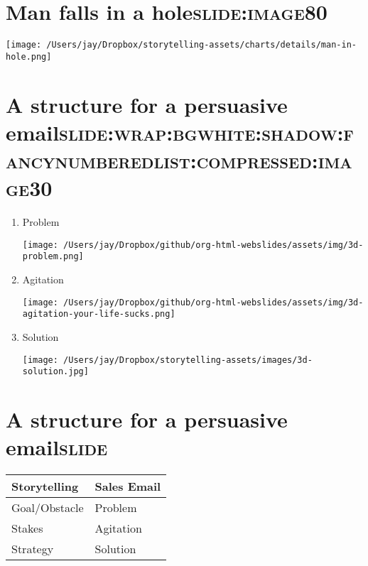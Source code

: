 \documentclass[12pt]{article}
\begin{document}
\section[Man falls in a hole]{Man falls in a hole\hfill{}\textsc{slide:image80}}
\label{sec:org2497390}
\begin{center}
\texttt{[image: /Users/jay/Dropbox/storytelling-assets/charts/details/man-in-hole.png]}
\end{center}

\section[A structure for a persuasive email]{A structure for a persuasive email\hfill{}\textsc{slide:wrap:bgwhite:shadow:fancynumberedlist:compressed:image30}}
\label{sec:org871ef79}
\begin{enumerate}
\item Problem \begin{center}
\texttt{[image: /Users/jay/Dropbox/github/org-html-webslides/assets/img/3d-problem.png]}
\end{center}
\item Agitation \begin{center}
\texttt{[image: /Users/jay/Dropbox/github/org-html-webslides/assets/img/3d-agitation-your-life-sucks.png]}
\end{center}
\item Solution \begin{center}
\texttt{[image: /Users/jay/Dropbox/storytelling-assets/images/3d-solution.jpg]}
\end{center}
\end{enumerate}

\section[A structure for a persuasive email]{A structure for a persuasive email\hfill{}\textsc{slide}}
\label{sec:org67a9106}
\begin{center}
\begin{tabular}{ll}
\hline
Storytelling & Sales Email\\
\hline
Goal/Obstacle & Problem\\
Stakes & Agitation\\
Strategy & Solution\\
\hline
\end{tabular}
\end{center}
\end{document}
